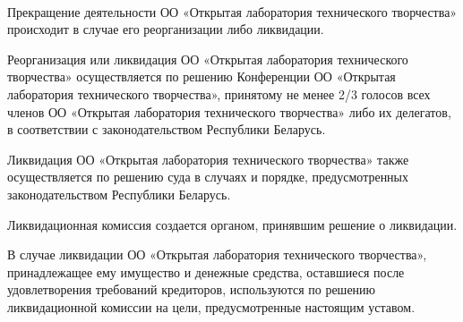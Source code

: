 \documentclass[a4paper,fontsize=14pt,titlepage]{scrartcl}
\makeatletter
\newenvironment{numberedpars}{%
  \addtocounter{secnumdepth}{1}
  \renewcommand\theparagraph{\arabic{section}.\arabic{paragraph}}
  \renewcommand\@seccntformat[1]
  {\expandafter\ifx\csname##1\endcsname\paragraph\csname 
  the##1\endcsname\else\csname the##1\endcsname\quad\fi}
  \let\old@par=\par
  \def\new@par{\let\par=\old@par\paragraph{}\let\par=\new@par}
  \let\par=\new@par
  \par
}{
  \addtocounter{secnumdepth}{-1}
}
\makeatother
\begin{document}
\begin{numberedpars}
Прекращение деятельности ОО «Открытая лаборатория технического творчества» происходит в случае его реорганизации либо
ликвидации.

Реорганизация или ликвидация ОО «Открытая лаборатория технического творчества» осуществляется по решению Конференции ОО
«Открытая лаборатория технического творчества», принятому не менее 2/3 голосов всех членов ОО «Открытая лаборатория
технического творчества» либо их делегатов, в соответствии с законодательством Республики Беларусь.

Ликвидация ОО «Открытая лаборатория технического творчества» также осуществляется по решению суда в случаях и порядке,
предусмотренных законодательством Республики Беларусь.

Ликвидационная комиссия создается органом, принявшим решение о ликвидации.

В случае ликвидации ОО «Открытая лаборатория технического творчества», принадлежащее ему имущество и денежные средства,
оставшиеся после удовлетворения требований кредиторов, используются по решению ликвидационной комиссии на цели,
предусмотренные настоящим уставом.
\end{numberedpars}
\end{document}
